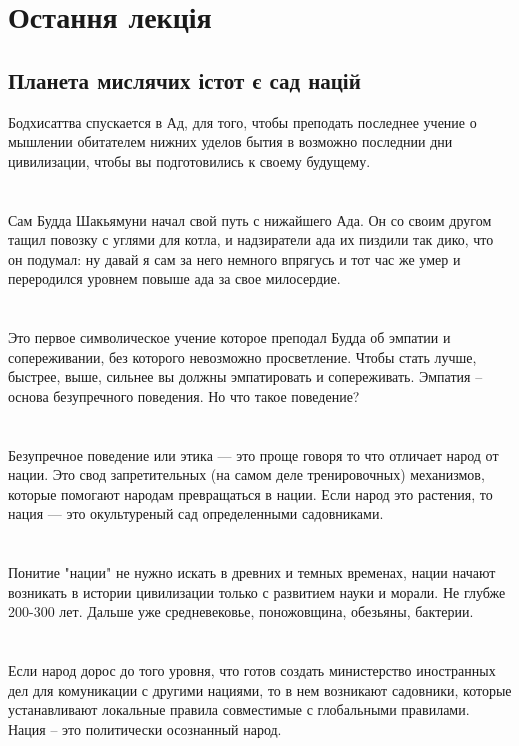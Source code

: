\section{Остання лекція}

\subsection{Планета мислячих істот є сад націй}

Бодхисаттва спускается в Ад, для того, чтобы преподать последнее учение о мышлении обитателем нижних уделов бытия в возможно последнии дни цивилизации, чтобы вы подготовились к своему будущему.\\
\\
\\
Сам Будда Шакьямуни начал свой путь с нижайшего Ада. Он со своим другом тащил повозку с углями для котла, и надзиратели ада их пиздили так дико, что он подумал: ну давай я сам за него немного впрягусь и тот час же умер и переродился уровнем повыше ада за свое милосердие.\\
\\
\\
Это первое символическое учение которое преподал Будда об эмпатии и сопереживании, без которого невозможно просветление. Чтобы стать лучше, быстрее, выше, сильнее вы должны эмпатировать и сопереживать. Эмпатия -- основа безупречного поведения. Но что такое поведение?\\
\\
\\
Безупречное поведение или этика — это проще говоря то что отличает народ от нации. Это свод запретительных (на самом деле тренировочных) механизмов, которые помогают народам превращаться в нации. Если народ это растения, то нация — это окультуреный сад определенными садовниками.\\
\\
\\
Понитие "нации" не нужно искать в древних и темных временах, нации начают возникать в истории цивилизации только с развитием науки и морали. Не глубже 200-300 лет. Дальше уже средневековье, поножовщина, обезьяны, бактерии.\\
\\
\\
Если народ дорос до того уровня, что готов создать министерство иностранных дел для комуникации с другими нациями, то в нем возникают садовники, которые устанавливают локальные правила совместимые с глобальными правилами. Нация -- это политически осознанный народ.\\
